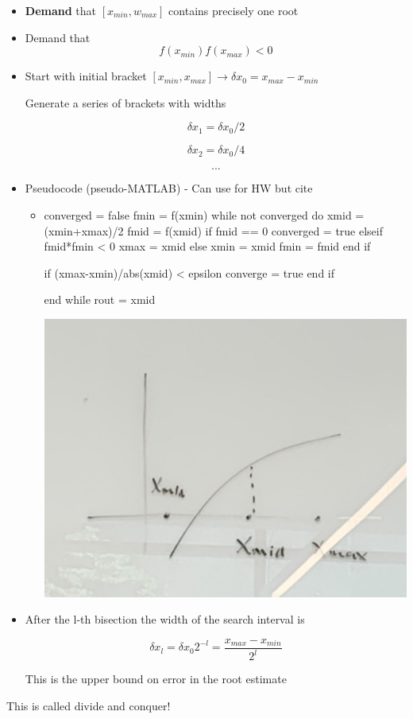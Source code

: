 \begin{itemize}
    \item \textbf{Demand} that $[x_{min}, w_{max}]$ contains precisely one root
    \item Demand that 
    \[f(x_{min}) f(x_{max}) < 0\]

    \item Start with initial bracket $[x_{min}, x_{max}] \rightarrow \delta x_0 = x_{max}-x_{min}$

    Generate a series of brackets with widths

    \[\delta x_1 = \delta x_0 /2 \]

    \[ \delta x_2 = \delta x_0 / 4 \]

    \[...\]

    \item Pseudocode (pseudo-MATLAB) - Can use for HW but cite

    \begin{itemize}
        \item  
        
        converged = false
        fmin = f(xmin)
        while not converged do
            xmid = (xmin+xmax)/2
            fmid = f(xmid)
            if fmid == 0
                converged = true
            elseif fmid*fmin < 0
                xmax = xmid
            else 
                xmin = xmid
                fmin = fmid
            end if 


            if (xmax-xmin)/abs(xmid) < epsilon
                converge = true
            end if 

            end while
            rout = xmid

            \includegraphics[width = 0.4\linewidth]{Images/410Notes_MATLAB.png}
            
        
    \end{itemize}
    \item After the l-th bisection the width of the search interval is 

    \[ \delta x_l = \delta x_0 2^ {-l} = \frac{x_{max} - x_{min}}{2^l}\]

    This is the upper bound on error in the root estimate

    
\end{itemize}

This is called divide and conquer! 
